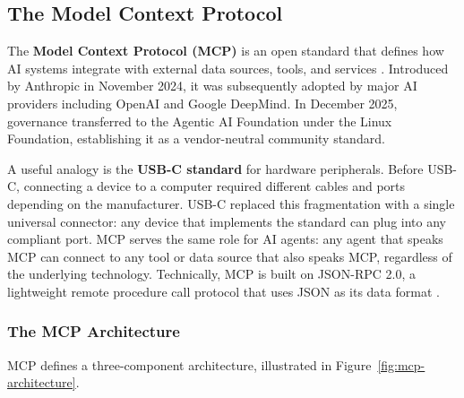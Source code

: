 \documentclass{article}
\begin{document}
\subsection{The Model Context Protocol}
\label{sec:mcp}

The \textbf{Model Context Protocol (MCP)} is an open standard that defines how AI systems integrate with external data sources, tools, and services \cite{anthropicmcp2024}. Introduced by Anthropic in November 2024, it was subsequently adopted by major AI providers including OpenAI and Google DeepMind. In December 2025, governance transferred to the Agentic AI Foundation under the Linux Foundation, establishing it as a vendor-neutral community standard.

A useful analogy is the \textbf{USB-C standard} for hardware peripherals. Before USB-C, connecting a device to a computer required different cables and ports depending on the manufacturer. USB-C replaced this fragmentation with a single universal connector: any device that implements the standard can plug into any compliant port. MCP serves the same role for AI agents: any agent that speaks MCP can connect to any tool or data source that also speaks MCP, regardless of the underlying technology. Technically, MCP is built on JSON-RPC 2.0, a lightweight remote procedure call protocol that uses JSON as its data format \cite{mcpspec2025}.

\subsubsection{The MCP Architecture}

MCP defines a three-component architecture, illustrated in Figure~\ref{fig:mcp-architecture}.
\end{document}
